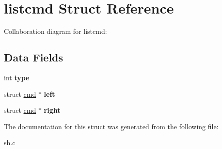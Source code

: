 \hypertarget{structlistcmd}{}\section{listcmd Struct Reference}
\label{structlistcmd}


Collaboration diagram for listcmd\+:
\subsection*{Data Fields}
\begin{DoxyCompactItemize}
\item 
\mbox{\label{structlistcmd_a2db395eea2aa2323b521cd272c6ccc23}} 
int {\bfseries type}
\item 
\mbox{\label{structlistcmd_a3058dfa06817a015f821d38f1e1edc3b}} 
struct \mbox{\hyperlink{structcmd}{cmd}} $\ast$ {\bfseries left}
\item 
\mbox{\label{structlistcmd_a063a3a59362ddfafb7c0e4c848d4e8c5}} 
struct \mbox{\hyperlink{structcmd}{cmd}} $\ast$ {\bfseries right}
\end{DoxyCompactItemize}


The documentation for this struct was generated from the following file\+:\begin{DoxyCompactItemize}
\item 
sh.\+c\end{DoxyCompactItemize}
